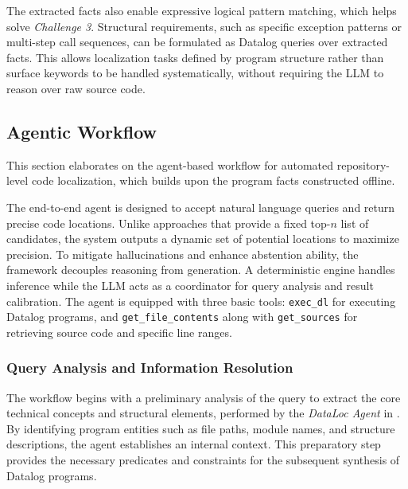 The extracted facts also enable expressive logical pattern matching, which helps solve \textit{Challenge 3}. Structural requirements, such as specific exception patterns or multi-step call sequences, can be formulated as Datalog queries over extracted facts. This allows localization tasks defined by program structure rather than surface keywords to be handled systematically, without requiring the LLM to reason over raw source code.



\subsection{Agentic Workflow}
This section elaborates on the agent-based workflow for automated repository-level code localization, which builds upon the program facts constructed offline.

The end-to-end agent is designed to accept natural language queries and return precise code locations. Unlike approaches that provide a fixed top-$n$ list of candidates, the system outputs a dynamic set of potential locations to maximize precision. To mitigate hallucinations and enhance abstention ability, the framework decouples reasoning from generation. A deterministic engine handles inference while the LLM acts as a coordinator for query analysis and result calibration. The agent is equipped with three basic tools: \texttt{exec\_dl} for executing Datalog programs, and \texttt{get\_file\_contents} along with \texttt{get\_sources} for retrieving source code and specific line ranges.

\subsubsection{Query Analysis and Information Resolution}
The workflow begins with a preliminary analysis of the query to extract the core technical concepts and structural elements, performed by the \textit{DataLoc Agent} in . By identifying program entities such as file paths, module names, and structure descriptions, the agent establishes an internal context. This preparatory step provides the necessary predicates and constraints for the subsequent synthesis of Datalog programs.

